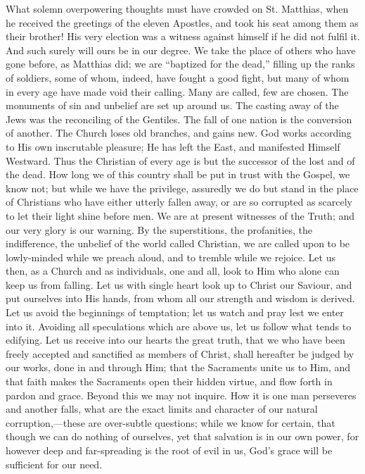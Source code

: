 What solemn overpowering thoughts must have crowded on St. Matthias,
when he received the greetings of the eleven Apostles, and took his seat
among them as their brother! His very election was a witness against
himself if he did not fulfil it. And such surely will ours be in our
degree. We take the place of others who have gone before, as Matthias
did; we are ``baptized for the dead,'' filling up the ranks of
soldiers, some of whom, indeed, have fought a good fight, but many of
whom in every age have made void their calling. Many are called, few are
chosen. The monuments of sin and unbelief are set up around us. The
casting away of the Jews was the reconciling of the Gentiles. The fall
of one nation is the conversion of another. The Church loses old
branches, and gains new. God works according to His own inscrutable
pleasure; He has left the East, and manifested Himself Westward. Thus
the Christian of every age is but the successor of the lost and of the
dead. How long we of this country shall be put in trust with the Gospel,
we know not; but while we have the privilege, assuredly we do but stand
in the place of Christians who have either utterly fallen away, or are
so corrupted as scarcely to let their light shine before men. We are at
present witnesses of the Truth; and our very glory is our warning. By
the superstitions, the profanities, the indifference, the unbelief of
the world called Christian, we are called upon to be lowly-minded while
we preach aloud, and to tremble while we rejoice. Let us then, as a
Church and as individuals, one and all, look to Him who alone can keep
us from falling. Let us with single heart look up to Christ our Saviour,
and put ourselves into His hands, from whom all our strength and wisdom
is derived. Let us avoid the beginnings of temptation; let us watch and
pray lest we enter into it. Avoiding all speculations which are above
us, let us follow what tends to edifying. Let us receive into our hearts
the great truth, that we who have been freely accepted and sanctified as
members of Christ, shall hereafter be judged by our works, done in and
through Him; that the Sacraments unite us to Him, and that faith makes
the Sacraments open their hidden virtue, and flow forth in pardon and
grace. Beyond this we may not inquire. How it is one man perseveres and
another falls, what are the exact limits and character of our natural
corruption,—these are over-subtle questions; while we know for
certain, that though we can do nothing of ourselves, yet that salvation
is in our own power, for however deep and far-spreading is the root of
evil in us, God's grace will be sufficient for our need.

